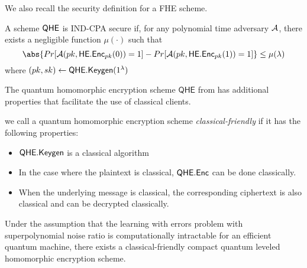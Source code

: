 We also recall the security definition for a FHE scheme.

\begin{definition}
	A scheme $\mathsf{QHE}$ is IND-CPA secure if, for any polynomial time adversary $\mathcal{A}$, there exists a negligible function $\mu(\cdot)$ such that
	$$\abs{Pr[\cA(pk, \mathsf{HE.Enc}_{pk}(0))=1]-Pr[\cA(pk, \mathsf{HE.Enc}_{pk}(1))=1]}\leq\mu(\lambda)$$
	where $(pk, sk)\leftarrow\mathsf{QHE.Keygen}(1^\lambda)$
\end{definition}

The quantum homomorphic encryption scheme $\mathsf{QHE}$ from \cite{mahadev_qfhe} has additional properties that facilitate the use of classical clients.

\begin{definition}
	we call a quantum homomorphic encryption scheme \emph{classical-friendly} if it has the following properties:
	\begin{itemize}
		\item $\mathsf{QHE.Keygen}$ is a classical algorithm
		\item In the case where the plaintext is classical, $\mathsf{QHE.Enc}$ can be done classically.
		\item When the underlying message is classical, the corresponding ciphertext is also classical and can be decrypted classically.
	\end{itemize}
\end{definition}

\begin{theorem} 
	Under the assumption that the learning with errors problem with superpolynomial noise ratio is computationally intractable for an efficient quantum machine,
	there exists a classical-friendly compact quantum leveled homomorphic encryption scheme.
\end{theorem}
